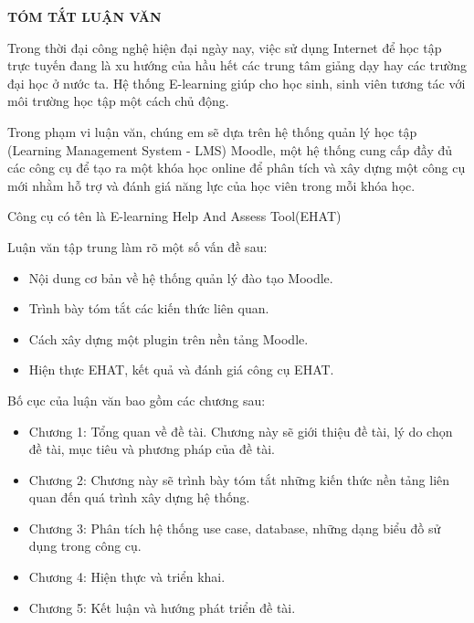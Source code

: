 \centerline{\bf \large\MakeUppercase{Tóm tắt luận văn}}
\vspace{20pt}

Trong thời đại công nghệ hiện đại ngày nay, việc sử dụng Internet để học tập trực tuyến đang là xu hướng của hầu hết các trung tâm giảng dạy hay các trường đại học ở nước ta. Hệ thống E-learning giúp cho học sinh, sinh viên tương tác với môi trường học tập một cách chủ động.

Trong phạm vi luận văn, chúng em sẽ dựa trên hệ thống quản lý học tập (Learning Management System - LMS) Moodle, một hệ thống cung cấp đầy đủ các công cụ để tạo ra một khóa học online để phân tích và xây dựng một công cụ mới nhằm hỗ trợ và đánh giá năng lực của học viên trong mỗi khóa học. 

Công cụ có tên là E-learning Help And Assess Tool(EHAT)

Luận văn tập trung làm rõ một số vấn đề sau:
\begin{itemize}
	\item Nội dung cơ bản về hệ thống quản lý đào tạo Moodle.
	\item Trình bày tóm tắt các kiến thức liên quan.
	\item Cách xây dựng một plugin trên nền tảng Moodle.
	\item Hiện thực EHAT, kết quả và đánh giá công cụ EHAT.
\end{itemize}

Bố cục của luận văn bao gồm các chương sau:
\begin{itemize}
	\item Chương 1: Tổng quan về đề tài. Chương này sẽ giới thiệu đề tài, lý do chọn đề tài, mục tiêu và phương pháp của đề tài.
	\item Chương 2: Chương này sẽ trình bày tóm tắt những kiến thức nền tảng liên quan đến quá trình xây dựng hệ thống.
	\item Chương 3: Phân tích hệ thống use case, database, những dạng biểu đồ sử dụng trong công cụ.
	\item Chương 4: Hiện thực và triển khai.
	\item Chương 5: Kết luận và hướng phát triển đề tài.
\end{itemize}